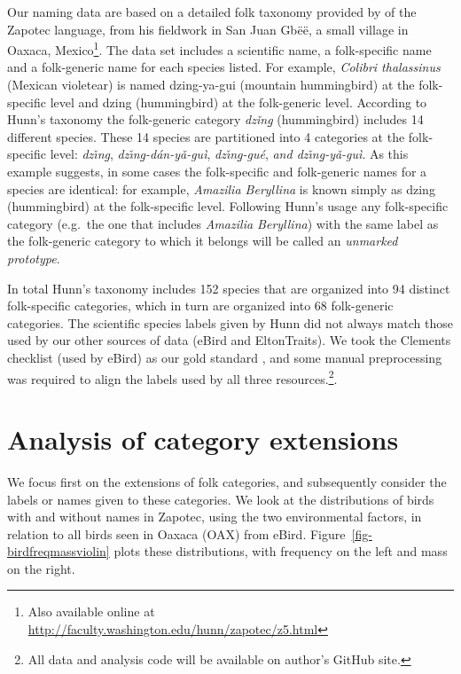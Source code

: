 \documentclass[10pt,letterpaper]{article}
\begin{document}
Our naming data are based on a detailed folk taxonomy provided by  of the Zapotec language, from his fieldwork in San Juan Gb\"{e}\"{e}, a small village in Oaxaca, Mexico\footnote{ Also available online at \url{http://faculty.washington.edu/hunn/zapotec/z5.html}}. The data set includes a scientific name,  a folk-specific name and a folk-generic name for each species listed. For example, \emph{ Colibri thalassinus} (Mexican violetear) is named dzing-ya-gui (mountain hummingbird) at the folk-specific level and dzing (hummingbird) at the folk-generic level.  According to Hunn's taxonomy the folk-generic category \textit{dz\v{i}n\b{g}} (hummingbird) includes 14 different species. These 14 species are partitioned into 4 categories at the folk-specific level: \textit{dz\v{\i}n\b{g}}, \textit{dz\v{\i}n\b{g}-d\'{a}n-y\v{a}-gu\`{i}}, \textit{dz\v{\i}n\b{g}-gu\'{e}}, \textit{and dz\v{\i}n\b{g}-y\v{a}-gu\`{i}}.
As this example suggests, in some cases the folk-specific and folk-generic names for a species are identical: for example, 
 \emph{ Amazilia Beryllina} is known simply as  dzing (hummingbird) at the folk-specific level.  Following Hunn's usage any folk-specific category (e.g.\ the one that includes \emph{ Amazilia Beryllina}) with the same label as the folk-generic category to which it belongs will be called an \emph{unmarked prototype}.


In total Hunn's taxonomy includes 152 species that are organized into 94 distinct folk-specific categories, which in turn are organized into 68 folk-generic categories.  The scientific species labels given by Hunn  did not always match those used by our other sources of data (eBird and EltonTraits).  We took the Clements checklist (used by eBird) as our gold standard \cite{clements2007clements}, and some manual preprocessing was required to align the labels used by all three resources.\footnote{All data and analysis code will be available on author's GitHub site.}.





\section{Analysis of category extensions}
We focus first on the extensions of folk categories, and subsequently consider the labels or names given to these categories. We look at the distributions of birds with and without names in Zapotec, using the two environmental factors, in relation to all birds seen in Oaxaca (OAX) from eBird.
Figure~\ref{fig-birdfreqmassviolin} plots these distributions, with frequency on the left and mass on the right.
\end{document}
